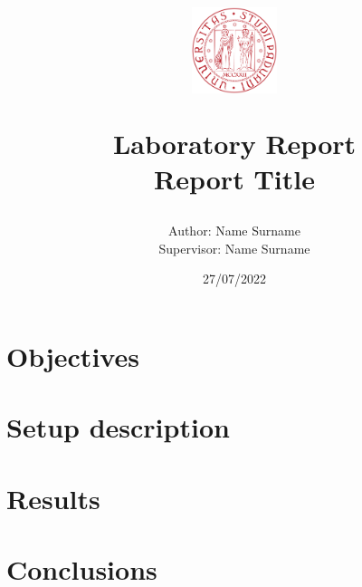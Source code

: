 \documentclass[twocolumn]{article}
\title{
    \vspace{-1cm}
    \includegraphics[height=2.5cm]{images/logo_unipd.png}
    \par
    \vspace{0.5cm}
    \textbf{Laboratory Report}\\
    Report Title
}
\author{
    Author: {Name Surname} \\
    Supervisor: {Name Surname}
}
\date{27/07/2022}
\begin{document}
\pagecolor{blond} %

\maketitle


%
%
%
%
%


\section{Objectives}
\lipsum[1]

\section{Setup description}
\lipsum[2-4]
\section{Results}
\lipsum[5-8]

\section{Conclusions}
\lipsum[1]



\end{document}
